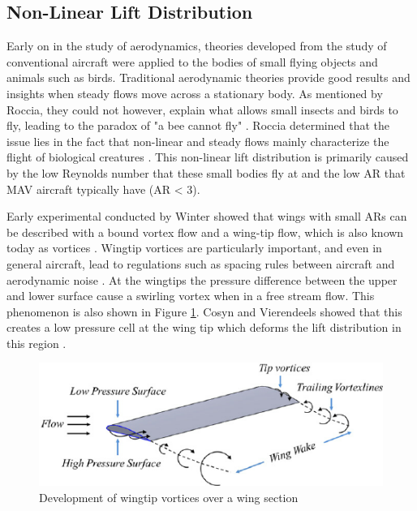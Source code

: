 
\subsection{Non-Linear Lift Distribution}


\label{sec:Non-Linear Lift Distribution}
Early on in the study of aerodynamics, theories developed from the study of conventional aircraft were applied to the bodies of small flying objects and animals such as birds. Traditional aerodynamic theories provide good results and insights when steady flows move across a stationary body. As mentioned by Roccia, they could not however, explain what allows small insects and birds to fly, leading to the paradox of "a bee cannot fly" \cite{bees} \cite{Roccia2016}. Roccia determined that the issue lies in the fact that non-linear and steady flows mainly characterize the flight of biological creatures \cite{Roccia2016}. This non-linear lift distribution is primarily caused by the low Reynolds number that these small bodies fly at and the low AR that MAV aircraft typically have (AR < 3).

 Early experimental conducted by Winter showed that wings with small ARs can be described with a bound vortex flow and a wing-tip flow, which is also known today as vortices \cite{H1936}. Wingtip vortices are particularly important, and even in general aircraft, lead to regulations such as spacing rules between aircraft and aerodynamic noise \cite{Qin2021}. At the wingtips the pressure difference between the upper and lower surface cause a swirling vortex when in a free stream flow. This phenomenon is also shown in Figure \ref{fig:vortex}. Cosyn and Vierendeels showed that this creates a low pressure cell at the wing tip which deforms the lift distribution in this region \cite{Cosyn2006}. 
 
 \begin{figure}[H]
  \centering
  \includegraphics[width=\linewidth]{03_LiteratureReview/Figs/Development-of-wingtip-vortices-over-a-wing-section.png}
  \caption{ Development of wingtip vortices over a wing section 
 \cite{Kumar2015}}
  \label{fig:vortex}
\end{figure}

